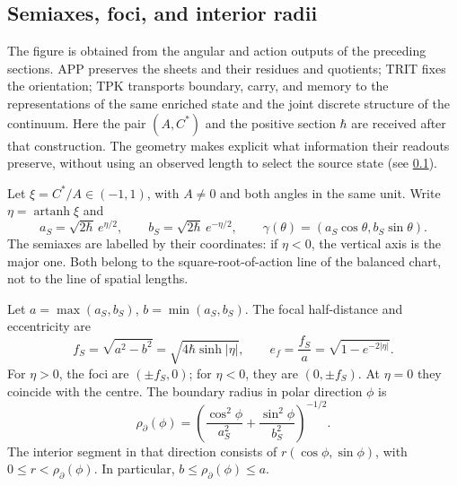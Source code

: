 
\subsection{Semiaxes, foci, and interior radii}
\label{sec:ii-elipse-geometria}

The figure is obtained from the angular and action outputs of the preceding
sections. APP preserves the sheets and their residues and quotients; TRIT fixes
the orientation; TPK transports boundary, carry, and memory to the
representations of the same enriched state and the joint discrete
structure of the continuum. Here the pair \((A,C^*)\) and the
positive section \(\hbar\) are received after that construction. The geometry makes
explicit what information their readouts preserve, without using an observed length
to select the source state (see \ref{sec:ii-elipse-geometria}).

Let \(\xi=C^*/A\in(-1,1)\), with \(A\ne0\) and both angles in the
same unit. Write \(\eta=\operatorname{artanh}\xi\) and
\[
 a_S=\sqrt{2\hbar}\,e^{\eta/2},\qquad
 b_S=\sqrt{2\hbar}\,e^{-\eta/2},\qquad
 \gamma(\theta)=(a_S\cos\theta,b_S\sin\theta).
\]
The semiaxes are labelled by their coordinates: if \(\eta<0\),
the vertical axis is the major one. Both belong to the square-root-of-action
line of the balanced chart, not to the line of spatial lengths.

\begin{proposition}
\label{prop:ii-elipse-focos}
Let \(a=\max(a_S,b_S)\), \(b=\min(a_S,b_S)\). The focal
half-distance and eccentricity are
\begin{equation}
 f_S=\sqrt{a^2-b^2}
 =\sqrt{4\hbar\sinh|\eta|},\qquad
 e_f=\frac{f_S}{a}=\sqrt{1-e^{-2|\eta|}}.
 \label{eq:ii-elipse-focal}
\end{equation}
For \(\eta>0\), the foci are \((\pm f_S,0)\); for
\(\eta<0\), they are \((0,\pm f_S)\). At \(\eta=0\) they coincide
with the centre. The boundary radius in polar direction \(\phi\) is
\begin{equation}
 \rho_{\partial}(\phi)
 =\left(\frac{\cos^2\phi}{a_S^2}
        +\frac{\sin^2\phi}{b_S^2}\right)^{-1/2}.
 \label{eq:ii-elipse-radio-polar}
\end{equation}
The interior segment in that direction consists of
\(r(\cos\phi,\sin\phi)\), with \(0\le r<\rho_{\partial}(\phi)\).
In particular, \(b\le\rho_{\partial}(\phi)\le a\).
\end{proposition}

